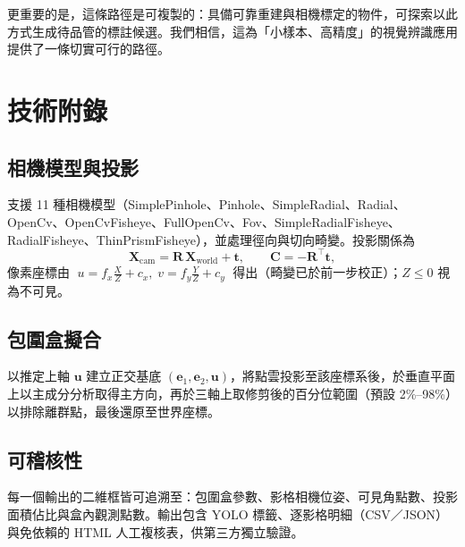 \documentclass[11pt,a4paper,fontset=windows]{ctexart}
\begin{document}
更重要的是，這條路徑是可複製的：具備可靠重建與相機標定的物件，可探索以此方式生成待品管的標註候選。我們相信，這為「小樣本、高精度」的視覺辨識應用提供了一條切實可行的路徑。

\vspace{6pt}
\begin{center}
\end{center}

\appendix
\section{技術附錄}

\subsection{相機模型與投影}

支援 11 種相機模型（SimplePinhole、Pinhole、SimpleRadial、Radial、OpenCv、OpenCvFisheye、FullOpenCv、Fov、SimpleRadialFisheye、RadialFisheye、ThinPrismFisheye），並處理徑向與切向畸變。投影關係為
\[
\mathbf{X}_{\text{cam}} = \mathbf{R}\,\mathbf{X}_{\text{world}} + \mathbf{t},\qquad
\mathbf{C} = -\mathbf{R}^{\top}\mathbf{t},
\]
像素座標由 $\;u = f_x \frac{X}{Z} + c_x,\; v = f_y \frac{Y}{Z} + c_y\;$ 得出（畸變已於前一步校正）；$Z \leq 0$ 視為不可見。

\subsection{包圍盒擬合}

以推定上軸 $\mathbf{u}$ 建立正交基底 $(\mathbf{e}_1,\mathbf{e}_2,\mathbf{u})$，將點雲投影至該座標系後，於垂直平面上以主成分分析取得主方向，再於三軸上取修剪後的百分位範圍（預設 2\%--98\%）以排除離群點，最後還原至世界座標。

\subsection{可稽核性}

每一個輸出的二維框皆可追溯至：包圍盒參數、影格相機位姿、可見角點數、投影面積佔比與盒內觀測點數。輸出包含 YOLO 標籤、逐影格明細（CSV／JSON）與免依賴的 HTML 人工複核表，供第三方獨立驗證。
\end{document}

